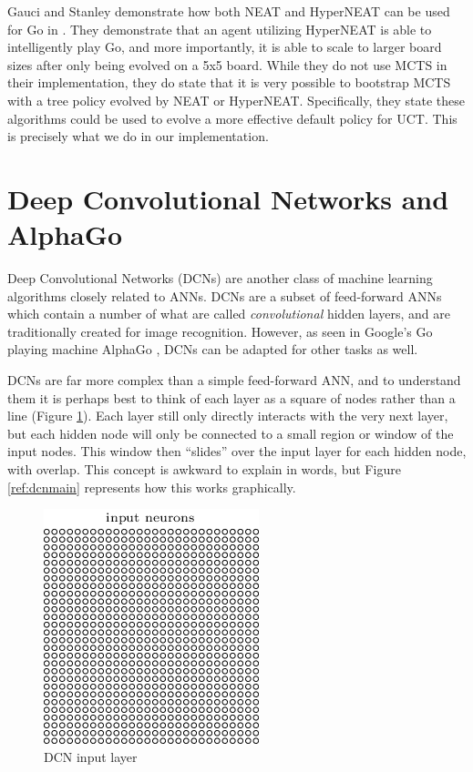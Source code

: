 Gauci and Stanley demonstrate how both NEAT and HyperNEAT can be used for Go in \cite{hyperneatgo}.  They demonstrate that an agent utilizing HyperNEAT is able to intelligently play Go, and more importantly, it is able to scale to larger board sizes after only being evolved on a 5x5 board.  While they do not use MCTS in their implementation, they do state that it is very possible to bootstrap MCTS with a tree policy evolved by NEAT or HyperNEAT.  Specifically, they state these algorithms could be used to evolve a more effective default policy for UCT.  This is precisely what we do in our implementation.

\section{Deep Convolutional Networks and AlphaGo}
Deep Convolutional Networks (DCNs) are another class of machine learning algorithms closely related to ANNs.  DCNs are a subset of feed-forward ANNs which contain a number of what are called \textit{convolutional} hidden layers, and are traditionally created for image recognition.  However, as seen in Google's Go playing machine AlphaGo \cite{alphago}, DCNs can be adapted for other tasks as well.

DCNs are far more complex than a simple feed-forward ANN, and to understand them it is perhaps best to think of each layer as a square of nodes rather than a line (Figure \ref{ref:dcn1}).  Each layer still only directly interacts with the very next layer, but each hidden node will only be connected to a small region or window of the input nodes.  This window then ``slides'' over the input layer for each hidden node, with overlap.  This concept is awkward to explain in words, but Figure \ref{ref:dcnmain} represents how this works graphically.

\begin{figure}[h]
\centering
\includegraphics[scale=0.5]{images/dcn1.png}
\caption{DCN input layer \cite{handwriting}}
\label{ref:dcn1}
\end{figure}


